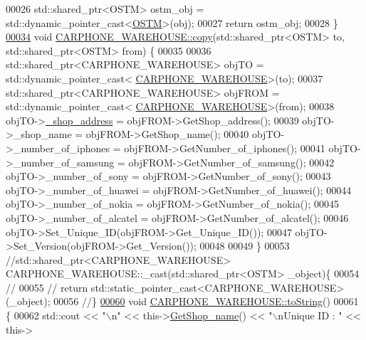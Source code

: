\begin{DoxyCode}
00026     std::shared\_ptr<OSTM> ostm\_obj = std::dynamic\_pointer\_cast<\hyperlink{class_o_s_t_m}{OSTM}>(obj);
00027     \textcolor{keywordflow}{return} ostm\_obj;
00028 \}
\hypertarget{_c_a_r_p_h_o_n_e___w_a_r_e_h_o_u_s_e_8cpp_source.tex_l00034}{}\hyperlink{class_c_a_r_p_h_o_n_e___w_a_r_e_h_o_u_s_e_ab9ecf71cd2728f348a5b61df698e054c_ab9ecf71cd2728f348a5b61df698e054c}{00034} \textcolor{keywordtype}{void} \hyperlink{class_c_a_r_p_h_o_n_e___w_a_r_e_h_o_u_s_e_ab9ecf71cd2728f348a5b61df698e054c_ab9ecf71cd2728f348a5b61df698e054c}{CARPHONE\_WAREHOUSE::copy}(std::shared\_ptr<OSTM> to, std::shared\_ptr<OSTM> from)
      \{
00035 
00036     std::shared\_ptr<CARPHONE\_WAREHOUSE> objTO = std::dynamic\_pointer\_cast<
      \hyperlink{class_c_a_r_p_h_o_n_e___w_a_r_e_h_o_u_s_e}{CARPHONE\_WAREHOUSE}>(to);
00037     std::shared\_ptr<CARPHONE\_WAREHOUSE> objFROM = std::dynamic\_pointer\_cast<
      \hyperlink{class_c_a_r_p_h_o_n_e___w_a_r_e_h_o_u_s_e}{CARPHONE\_WAREHOUSE}>(from);
00038     objTO->\hyperlink{class_c_a_r_p_h_o_n_e___w_a_r_e_h_o_u_s_e_a085b59da7d9f351043de6398b98898a7_a085b59da7d9f351043de6398b98898a7}{\_shop\_address} = objFROM->GetShop\_address();
00039     objTO->\_shop\_name = objFROM->GetShop\_name();
00040     objTO->\_number\_of\_iphones = objFROM->GetNumber\_of\_iphones();
00041     objTO->\_number\_of\_samsung = objFROM->GetNumber\_of\_samsung();
00042     objTO->\_number\_of\_sony = objFROM->GetNumber\_of\_sony();
00043     objTO->\_number\_of\_huawei = objFROM->GetNumber\_of\_huawei();
00044     objTO->\_number\_of\_nokia = objFROM->GetNumber\_of\_nokia();
00045     objTO->\_number\_of\_alcatel = objFROM->GetNumber\_of\_alcatel();
00046     objTO->Set\_Unique\_ID(objFROM->Get\_Unique\_ID());
00047     objTO->Set\_Version(objFROM->Get\_Version());
00048    
00049 \}
00053 \textcolor{comment}{//std::shared\_ptr<CARPHONE\_WAREHOUSE> CARPHONE\_WAREHOUSE::\_cast(std::shared\_ptr<OSTM> \_object)\{}
00054 \textcolor{comment}{//    }
00055 \textcolor{comment}{//    return std::static\_pointer\_cast<CARPHONE\_WAREHOUSE>(\_object);}
00056 \textcolor{comment}{//\}}
\hypertarget{_c_a_r_p_h_o_n_e___w_a_r_e_h_o_u_s_e_8cpp_source.tex_l00060}{}\hyperlink{class_c_a_r_p_h_o_n_e___w_a_r_e_h_o_u_s_e_a4d96bb512ffcd1e0b13f632cb7fd242b_a4d96bb512ffcd1e0b13f632cb7fd242b}{00060} \textcolor{comment}{}\textcolor{keywordtype}{void} \hyperlink{class_c_a_r_p_h_o_n_e___w_a_r_e_h_o_u_s_e_a4d96bb512ffcd1e0b13f632cb7fd242b_a4d96bb512ffcd1e0b13f632cb7fd242b}{CARPHONE\_WAREHOUSE::toString}()
00061 \{
00062    std::cout << \textcolor{stringliteral}{"\(\backslash\)n"} <<  this->\hyperlink{class_c_a_r_p_h_o_n_e___w_a_r_e_h_o_u_s_e_a4932d1483f97e12e01be200951c572df_a4932d1483f97e12e01be200951c572df}{GetShop\_name}() << \textcolor{stringliteral}{"\(\backslash\)nUnique ID : "} << this->

\end{DoxyCode}
